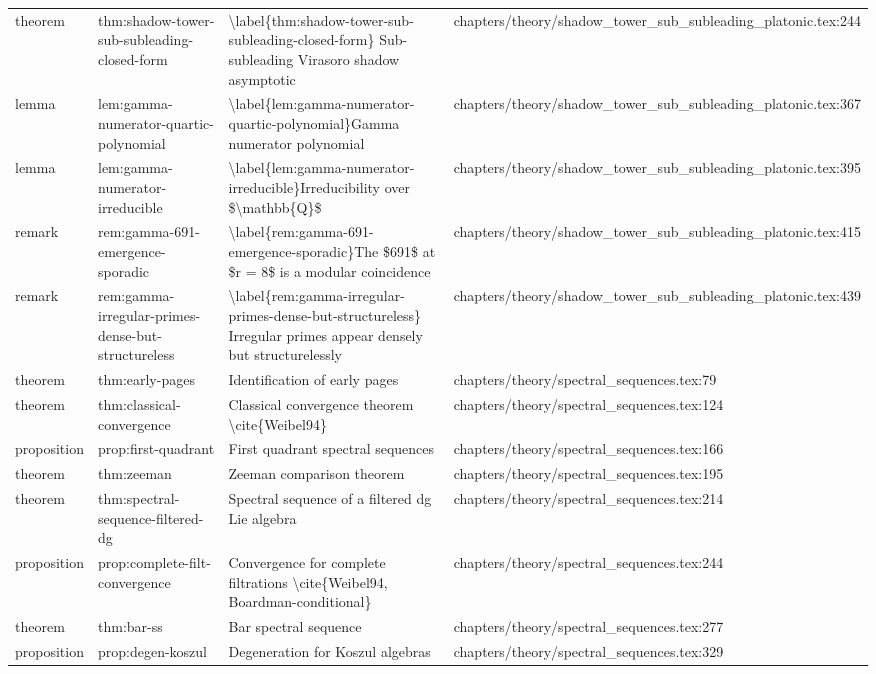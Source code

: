 \documentclass[11pt]{article}
\begin{document}
\begin{longtable}{L{0.10\textwidth}L{0.26\textwidth}L{0.42\textwidth}L{0.22\textwidth}}
theorem & thm:shadow-tower-sub-subleading-closed-form & \textbackslash{}label\{thm:shadow-tower-sub-subleading-closed-form\} Sub-subleading Virasoro shadow asymptotic & chapters/theory/shadow\_tower\_sub\_subleading\_platonic.tex:244\\
lemma & lem:gamma-numerator-quartic-polynomial & \textbackslash{}label\{lem:gamma-numerator-quartic-polynomial\}Gamma numerator polynomial & chapters/theory/shadow\_tower\_sub\_subleading\_platonic.tex:367\\
lemma & lem:gamma-numerator-irreducible & \textbackslash{}label\{lem:gamma-numerator-irreducible\}Irreducibility over \$\textbackslash{}mathbb\{Q\}\$ & chapters/theory/shadow\_tower\_sub\_subleading\_platonic.tex:395\\
remark & rem:gamma-691-emergence-sporadic & \textbackslash{}label\{rem:gamma-691-emergence-sporadic\}The \$691\$ at \$r = 8\$ is a modular coincidence & chapters/theory/shadow\_tower\_sub\_subleading\_platonic.tex:415\\
remark & rem:gamma-irregular-primes-dense-but-structureless & \textbackslash{}label\{rem:gamma-irregular-primes-dense-but-structureless\} Irregular primes appear densely but structurelessly & chapters/theory/shadow\_tower\_sub\_subleading\_platonic.tex:439\\
theorem & thm:early-pages & Identification of early pages & chapters/theory/spectral\_sequences.tex:79\\
theorem & thm:classical-convergence & Classical convergence theorem \textbackslash{}cite\{Weibel94\} & chapters/theory/spectral\_sequences.tex:124\\
proposition & prop:first-quadrant & First quadrant spectral sequences & chapters/theory/spectral\_sequences.tex:166\\
theorem & thm:zeeman & Zeeman comparison theorem & chapters/theory/spectral\_sequences.tex:195\\
theorem & thm:spectral-sequence-filtered-dg & Spectral sequence of a filtered dg Lie algebra & chapters/theory/spectral\_sequences.tex:214\\
proposition & prop:complete-filt-convergence & Convergence for complete filtrations \textbackslash{}cite\{Weibel94, Boardman-cond{}itional\} & chapters/theory/spectral\_sequences.tex:244\\
theorem & thm:bar-ss & Bar spectral sequence & chapters/theory/spectral\_sequences.tex:277\\
proposition & prop:degen-koszul & Degeneration for Koszul algebras & chapters/theory/spectral\_sequences.tex:329\\

\end{longtable}
\end{document}
